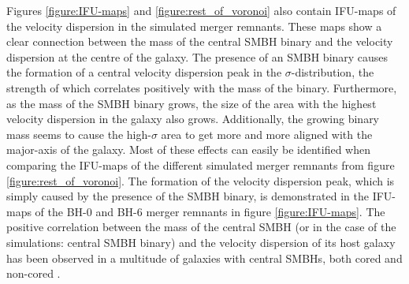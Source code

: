 \documentclass[english, oneside]{HYgradu}
\begin{document}
Figures \ref{figure:IFU-maps} and \ref{figure:rest_of_voronoi} also contain IFU-maps of the velocity dispersion in the simulated merger remnants. These maps show a clear connection between the mass of the central SMBH binary and the velocity dispersion at the centre of the galaxy. The presence of an SMBH binary causes the formation of a central velocity dispersion peak in the $\sigma$-distribution, the strength of which correlates positively with the mass of the binary. Furthermore, as the mass of the SMBH binary grows, the size of the area with the highest velocity dispersion in the galaxy also grows. Additionally, the growing binary mass seems to cause the high-$\sigma$ area to get more and more aligned with the major-axis of the galaxy. Most of these effects can easily be identified when comparing the IFU-maps of the different simulated merger remnants from figure \ref{figure:rest_of_voronoi}. The formation of the velocity dispersion peak, which is simply caused by the presence of the SMBH binary, is demonstrated in the IFU-maps of the BH-0 and BH-6 merger remnants in figure \ref{figure:IFU-maps}. The positive correlation between the mass of the central SMBH (or in the case of the simulations: central SMBH binary) and the velocity dispersion of its host galaxy has been observed in a multitude of galaxies with central SMBHs, both cored and non-cored \citep{Ferrarese2000}.
\end{document}
